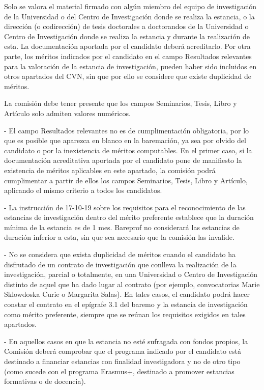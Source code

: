\documentclass{article}
\begin{document}
\begin{itemize}
\begin{itemize}
\begin{scriptsize}
                  Solo se valora el material firmado con algún miembro del equipo de investigación de la Universidad o del Centro de Investigación donde se realiza la estancia, o la dirección (o codirección) de tesis doctorales a doctorandos de la Universidad o Centro de Investigación donde se realiza la estancia y durante la realización de esta. La documentación aportada por el candidato deberá acreditarlo. Por otra parte, los méritos indicados por el candidato en el campo Resultados relevantes para la valoración de la estancia de investigación, pueden haber sido incluidos en otros apartados del CVN, sin que por ello se considere que existe duplicidad de méritos.

                  La comisión debe tener presente que los campos Seminarios, Tesis, Libro y Artículo solo admiten valores numéricos.

                  - El campo Resultados relevantes no es de cumplimentación obligatoria, por lo que es posible que aparezca en blanco en la baremación, ya sea por olvido del candidato o por la inexistencia de méritos computables. En el primer caso, si la documentación acreditativa aportada por el candidato pone de manifiesto la existencia de méritos aplicables en este apartado, la comisión podrá cumplimentar a partir de ellos los campos Seminarios, Tesis, Libro y Artículo, aplicando el mismo criterio a todos los candidatos.

                  - La instrucción de 17-10-19 sobre los requisitos para el reconocimiento de las estancias de investigación dentro del mérito preferente establece que la duración mínima de la estancia es de 1 mes. Bareprof no considerará las estancias de duración inferior a esta, sin que sea necesario que la comisión las invalide.

                  - No se considera que exista duplicidad de méritos cuando el candidato ha disfrutado de un contrato de investigación que conlleva la realización de la investigación, parcial o totalmente, en una Universidad o Centro de Investigación distinto de aquel que ha dado lugar al contrato (por ejemplo, convocatorias Marie Sklowdoska Curie o Margarita Salas). En tales casos, el candidato podrá hacer constar el contrato en el epígrafe 3.1 del baremo y la estancia de investigación como mérito preferente, siempre que se reúnan los requisitos exigidos en tales apartados.

                  - En aquellos casos en que la estancia no esté sufragada con fondos propios, la Comisión deberá comprobar que el programa indicado por el candidato está destinado a financiar estancias con finalidad investigadora y no de otro tipo (como sucede con el programa Erasmus+, destinado a promover estancias formativas o de docencia).


\end{scriptsize}
\end{itemize}
\end{itemize}
\end{document}

